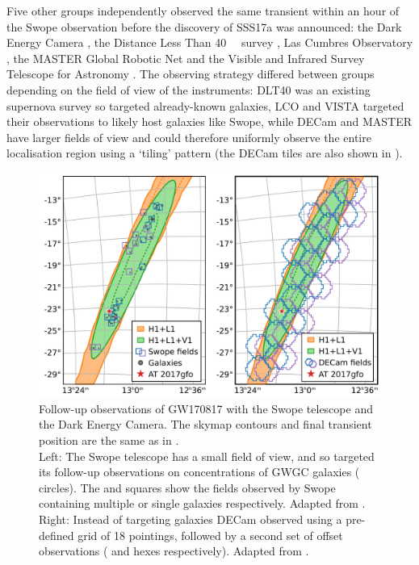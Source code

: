 \begin{colsection}
\begin{colsection}
Five other groups independently observed the same transient within an hour of the Swope observation before the discovery of SSS17a was announced: the Dark Energy Camera \citep[DECam,][]{GW170817_DECam}, the Distance Less Than \SI{40}{\mega\parsec} survey \citep[DLT40,][]{GW170817_DLT40}, Las Cumbres Observatory \citep[LCO,][]{GW170817_LCO}, the MASTER Global Robotic Net \citep{GW170817_MASTER} and the  Visible and Infrared Survey Telescope for Astronomy \citep[VISTA,][]{GW170817_VISTA}. The observing strategy differed between groups depending on the field of view of the instruments: DLT40 was an existing supernova survey so targeted already-known galaxies, LCO and VISTA targeted their observations to likely host galaxies like Swope, while DECam and MASTER have larger fields of view and could therefore uniformly observe the entire localisation region using a `tiling' pattern (the DECam tiles are also shown in ).

\begin{figure}[p]
    \begin{center}
        \includegraphics[width=\linewidth]{images/170817_obs.pdf}
    \end{center}
    \caption[Follow-up observations of GW170817 with Swope and DECam]{
        Follow-up observations of GW170817 with the Swope telescope and the Dark Energy Camera. The skymap contours and final transient position are the same as in . \\
        Left: The Swope telescope has a small field of view, and so targeted its follow-up observations on concentrations of GWGC galaxies ( circles). The  and  squares show the fields observed by Swope containing multiple or single galaxies respectively. Adapted from \citet{GW170817_Swope}.\\
        Right: Instead of targeting galaxies DECam observed using a pre-defined grid of 18 pointings, followed by a second set of offset observations ( and  hexes respectively). Adapted from \citet{GW170817_DECam}.
        }\label{fig:swope_decam}
\end{figure}


\end{colsection}
\end{colsection}
